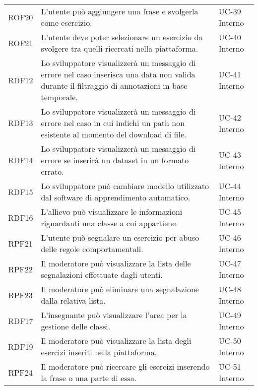 \begin{tabularx}{\textwidth}{| c | p{10cm} | X |}
		ROF20 & L'utente può aggiungere una frase e svolgerla come esercizio. & UC-39 \newline Interno\\
		ROF21 & L'utente deve poter selezionare un esercizio da svolgere tra quelli ricercati nella piattaforma. & UC-40 \newline Interno\\
		RDF12 & Lo sviluppatore visualizzerà un messaggio di errore nel caso inserisca una data non valida durante il filtraggio di annotazioni in base temporale. & UC-41 \newline Interno\\
		RDF13 & Lo sviluppatore visualizzerà un messaggio di errore nel caso in cui indichi un path non esistente al momento del download di file. & UC-42 \newline Interno\\
		RDF14 & Lo sviluppatore visualizzerà un messaggio di errore se inserirà un dataset in un formato errato. & UC-43 \newline Interno\\
		RDF15 & Lo sviluppatore può cambiare modello utilizzato dal software di apprendimento automatico. & UC-44 \newline Interno\\
		RDF16 & L'allievo può visualizzare le informazioni riguardanti una classe a cui appartiene. & UC-45 \newline Interno\\
		RPF21 & L'utente può segnalare un esercizio per abuso delle regole comportamentali. & UC-46 \newline Interno\\
		RPF22 & Il moderatore può visualizzare la lista delle segnalazioni effettuate dagli utenti. & UC-47 \newline Interno\\
		RPF23 & Il moderatore può eliminare una segnalazione dalla relativa lista. & UC-48 \newline Interno\\
		RDF17 & L'insegnante può visualizzare l'area per la gestione delle classi. & UC-49 \newline Interno\\
		RDF19 & Il moderatore può visualizzare la lista degli esercizi inseriti nella piattaforma. & UC-50 \newline Interno\\
		RPF24 & Il moderatore può ricercare gli esercizi inserendo la frase o una parte di essa. & UC-51 \newline Interno\\

\end{tabularx}
